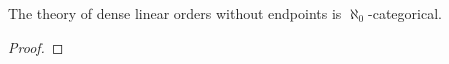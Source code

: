 
\begin{theorem}
    \label{thm:dlo-aleph0-categorical}
    \notready
    The theory of dense linear orders without endpoints is $\aleph_0$-categorical.
\end{theorem}
\begin{proof}
    \notready
\end{proof}
